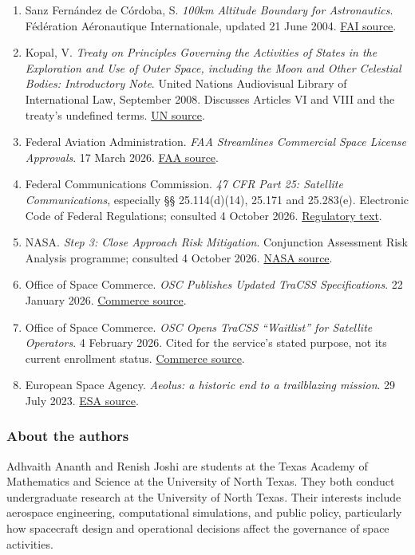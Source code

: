 \documentclass[11pt,letterpaper]{article}
\begin{document}
\begingroup\small
\begin{enumerate}
\def\labelenumi{\arabic{enumi}.}
\item
  Sanz Fernández de Córdoba, S. \emph{100km Altitude Boundary for
  Astronautics}. Fédération Aéronautique Internationale, updated 21 June
  2004. \href{https://www.fai.org/page/icare-boundary}{FAI source}.
\item
  Kopal, V. \emph{Treaty on Principles Governing the Activities of
  States in the Exploration and Use of Outer Space, including the Moon
  and Other Celestial Bodies: Introductory Note}. United Nations
  Audiovisual Library of International Law, September 2008. Discusses
  Articles VI and VIII and the treaty's undefined terms.
  \href{https://legal.un.org/avl/ha/tos/tos.html}{UN source}.
\item
  Federal Aviation Administration. \emph{FAA Streamlines Commercial
  Space License Approvals}. 17 March 2026.
  \href{https://www.faa.gov/newsroom/faa-streamlines-commercial-space-license-approvals}{FAA
  source}.
\item
  Federal Communications Commission. \emph{47 CFR Part 25: Satellite
  Communications}, especially §§ 25.114(d)(14), 25.171 and 25.283(e).
  Electronic Code of Federal Regulations; consulted 4 October 2026.
  \href{https://www.ecfr.gov/current/title-47/chapter-I/subchapter-B/part-25}{Regulatory
  text}.
\item
  NASA. \emph{Step 3: Close Approach Risk Mitigation}. Conjunction
  Assessment Risk Analysis programme; consulted 4 October 2026.
  \href{https://www.nasa.gov/cara/step-3-close-approach-risk-mitigation/}{NASA
  source}.
\item
  Office of Space Commerce. \emph{OSC Publishes Updated TraCSS
  Specifications}. 22 January 2026.
  \href{https://space.commerce.gov/osc-publishes-updated-tracss-specifications/}{Commerce
  source}.
\item
  Office of Space Commerce. \emph{OSC Opens TraCSS ``Waitlist'' for
  Satellite Operators}. 4 February 2026. Cited for the service's stated
  purpose, not its current enrollment status.
  \href{https://space.commerce.gov/osc-opens-tracss-waitlist-for-satellite-operators/}{Commerce
  source}.
\item
  European Space Agency. \emph{Aeolus: a historic end to a trailblazing
  mission}. 29 July 2023.
  \href{https://www.esa.int/Newsroom/Press_Releases/Aeolus_a_historic_end_to_a_trailblazing_mission}{ESA
  source}.
\end{enumerate}
\endgroup

\hypertarget{about-the-authors}{%
\subsubsection{About the authors}\label{about-the-authors}}

Adhvaith Ananth and Renish Joshi are students at the Texas Academy of Mathematics and
Science at the University of North Texas. They both conduct undergraduate research at the University of North Texas. Their interests include
aerospace engineering, computational simulations, and public policy,
particularly how spacecraft design and operational decisions affect the
governance of space activities.
\end{document}

